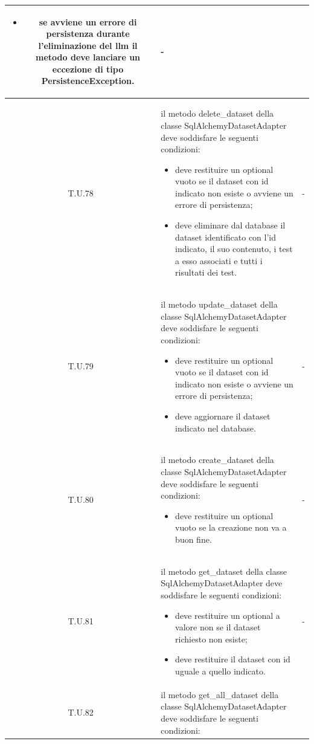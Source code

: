 \begin{tabularx}{\textwidth}{|c|X|c|}
\begin{itemize}
        \item se avviene un errore di persistenza durante l'eliminazione del llm il metodo deve lanciare un eccezione di tipo PersistenceException.
    \end{itemize} & - \\
    \hline 
    \label{tu:tu78} T.U.78 & il metodo delete\_dataset della classe SqlAlchemyDatasetAdapter deve soddisfare le seguenti condizioni:
    \begin{itemize}
        \item deve restituire un optional vuoto se il dataset con id indicato non esiste o avviene un errore di persistenza; 
        \item deve eliminare dal database il dataset identificato con l'id indicato, il suo contenuto, i test a esso associati e tutti i risultati dei test.
    \end{itemize} & - \\
    \hline 
    \label{tu:tu79} T.U.79 & il metodo update\_dataset della classe SqlAlchemyDatasetAdapter deve soddisfare le seguenti condizioni:
    \begin{itemize}
        \item deve restituire un optional vuoto se il dataset con id indicato non esiste o avviene un errore di persistenza; 
        \item deve aggiornare il dataset indicato nel database. 
    \end{itemize} & - \\
    \hline 
    \label{tu:tu80} T.U.80 & il metodo create\_dataset della classe SqlAlchemyDatasetAdapter deve soddisfare le seguenti condizioni:
    \begin{itemize}
        \item deve restituire un optional vuoto se la creazione non va a buon fine.
    \end{itemize} & - \\
    \hline 
    \label{tu:tu81} T.U.81 & il metodo get\_dataset della classe SqlAlchemyDatasetAdapter deve soddisfare le seguenti condizioni:
    \begin{itemize}
        \item deve restituire un optional a valore non se il dataset richiesto non esiste;
        \item deve restituire il dataset con id uguale a quello indicato.
    \end{itemize} & - \\
    \hline 
    \label{tu:tu82} T.U.82 & il metodo get\_all\_dataset della classe SqlAlchemyDatasetAdapter deve soddisfare le seguenti condizioni:

\end{tabularx}
